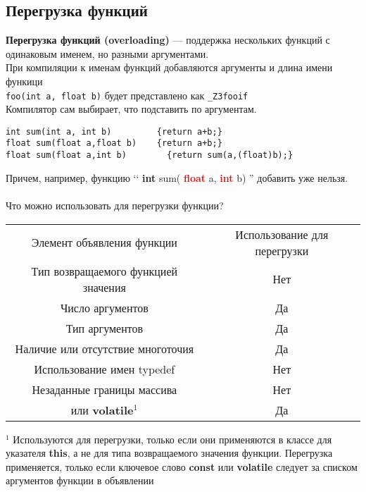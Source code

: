 \documentclass {article}
\begin{document}
\subsection{Перегрузка функций}
{\bfseries Перегрузка функций (overloading)} --- поддержка нескольких функций с одинаковым именем, но разными аргументами.\\
При компиляции к именам функций добавляются аргументы и длина имени функици\\
\texttt{foo(int a, float b)} будет представлено как \texttt{\_Z3fooif }\\
Компилятор сам выбирает, что подставить по аргументам.
\begin{lstlisting}[caption=Пример перегрузки функции]
int sum(int a, int b)         {return a+b;}
float sum(float a,float b)    {return a+b;}
float sum(float a,int b)        {return sum(a,(float)b);}
\end{lstlisting}
Причем, например, функцию ‘‘ {\bfseries int} sum({ \bfseries \textcolor{red}{ float}} a, {\bfseries \textcolor{red}{ int}} b) '' добавить уже нельзя.\\
\def\tabrowsep{\noalign{\vskip 1.2pt}}
\\Что можно использовать для перегрузки функции?
\begin{center}
\begin{tabular}{c c}
\rowcolor[rgb]{0.58,0.78,0.2} Элемент объявления функции & Использование для перегрузки\\\tabrowsep
\rowcolor[rgb]{0.7,0.7,0.7} Тип возвращаемого функцией значения & Нет \\\tabrowsep
\rowcolor[rgb]{0.7,0.7,0.7} Число аргументов & Да \\\tabrowsep
\rowcolor[rgb]{0.7,0.7,0.7} Тип аргументов & Да \\\tabrowsep
\rowcolor[rgb]{0.7,0.7,0.7} Наличие или отсутствие многоточия & Да \\\tabrowsep
\rowcolor[rgb]{0.7,0.7,0.7} Использование имен typedef & Нет \\\tabrowsep
\rowcolor[rgb]{0.7,0.7,0.7} Незаданные границы массива & Нет \\\tabrowsep
\rowcolor[rgb]{0.7,0.7,0.7}{\bfseries const} или {\bfseries volatile}$^1$ & Да \\
\end{tabular}
\end{center}
\footnotesize{$^1$ Используются для перегрузки, только если они применяются в классе для указателя {\bfseries this}, а не для типа возвращаемого значения функции. Перегрузка применяется, только если ключевое слово {\bfseries const} или {\bfseries volatile} следует за списком аргументов функции в объявлении}\\
\normalsize
\end{document}
